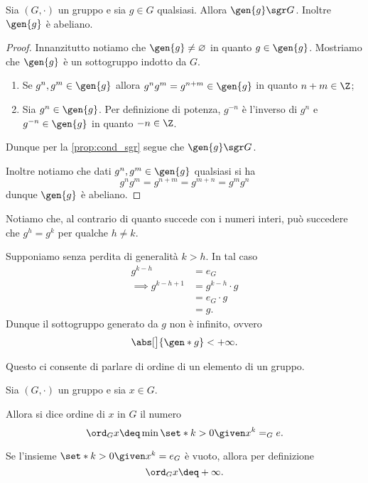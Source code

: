 \begin{proposition}
     \label{prop:sgr_generato_è_sgr}
    Sia $(G, \cdot)$ un gruppo e sia $g \in G$ qualsiasi. Allora $\gen{g} \sgr G$. Inoltre $\gen{g}$ è abeliano.
\end{proposition}
\begin{proof}
    Innanzitutto notiamo che $\gen{g} \neq \varnothing$ in quanto $g \in \gen{g}$. Mostriamo che $\gen{g}$ è un sottogruppo indotto da $G$.

    \begin{enumerate}[label={(\roman*)}]
        \item Se $g^n, g^m \in \gen{g}$ allora $g^ng^m = g^{n+m} \in \gen{g}$ in quanto $n+m \in \Z$;
        \item Sia $g^n \in \gen{g}$. Per definizione di potenza, $g^{-n}$ è l'inverso di $g^n$ e $g^{-n} \in \gen{g}$ in quanto $-n \in \Z$. 
    \end{enumerate}

    Dunque per la \autoref{prop:cond_sgr} segue che $\gen{g} \sgr G$.

    Inoltre notiamo che dati $g^n, g^m \in \gen{g}$ qualsiasi si ha \[
        g^ng^m = g^{n+m} = g^{m+n} = g^mg^n    
    \] dunque $\gen{g}$ è abeliano.
\end{proof}

Notiamo che, al contrario di quanto succede con i numeri interi, può succedere che $g^h = g^k$ per qualche $h \neq k$.

Supponiamo senza perdita di generalità $k > h$. In tal caso \begin{align*}
    g^{k-h} &= e_G\\
    \implies g^{k-h+1} &= g^{k-h} \cdot g\\
    &= e_G \cdot g\\
    &= g.
\end{align*}
Dunque il sottogruppo generato da $g$ non è infinito, ovvero \[
    \abs[\big]{\gen*{g}} < +\infty.    
\]

Questo ci consente di parlare di ordine di un elemento di un gruppo.

\begin{definition}
     \label{def:ord_grp}
    Sia $(G, \cdot)$ un gruppo e sia $x \in G$.

    Allora si dice ordine di $x$ in $G$ il numero \[
        \ord_{G}{x} \deq \min\set*{k > 0 \given x^k = _Ge}.    
    \]

    Se l'insieme $\set*{k > 0 \given x^k = e_G}$ è vuoto, allora per definizione \[
        \ord_{G}{x} \deq +\infty.
    \]
\end{definition}

